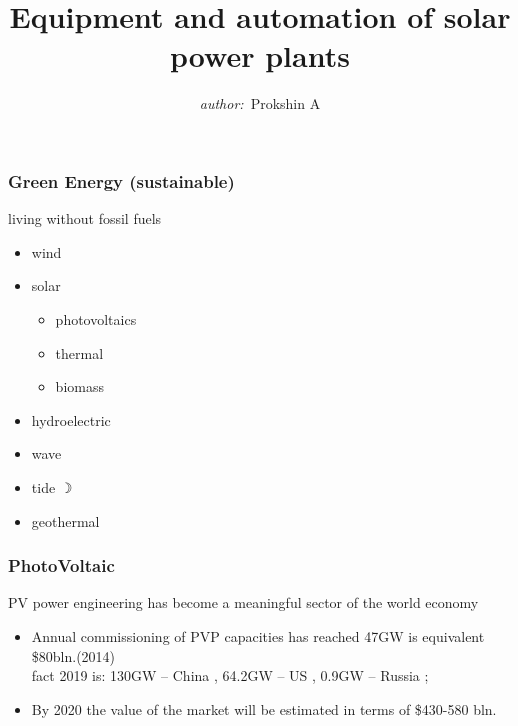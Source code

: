\documentclass[14pt]{beamer}
\begin{document}
\title{\small{Equipment and automation of solar power plants}}
\author{\small{%
\emph{author:}~Prokshin A}}



\vspace{30pt}%

\vspace{60pt}%



\begin{frame}
\titlepage	
\end{frame}

\begin{frame}
	\frametitle{\small Green Energy (sustainable)}

 living without fossil fuels
	\begin{itemize}
		\item wind
		\item solar
		\begin{itemize}
			\item photovoltaics
			\item thermal
			\item biomass
		\end{itemize}
	\item hydroelectric
	\item wave
	\item tide $\rightmoon$
	\item geothermal
	\end{itemize}
\end{frame}

\begin{frame}
\frametitle{\small PhotoVoltaic} 
PV power engineering has become a meaningful sector of the world economy
	\begin{itemize}
		\item Annual commissioning of PVP capacities has reached 47GW is equivalent \$80bln.(2014) \cite{Morgan}\\
		fact 2019 is: 130GW -- China  , 64.2GW -- US , 0.9GW -- Russia \cite{Morgan,BBC,Chinausfocus,CDU};
\item By 2020 the value of the market will be estimated in terms of \$430-580 bln. 

\end{itemize}
\end{frame}
\end{document}
